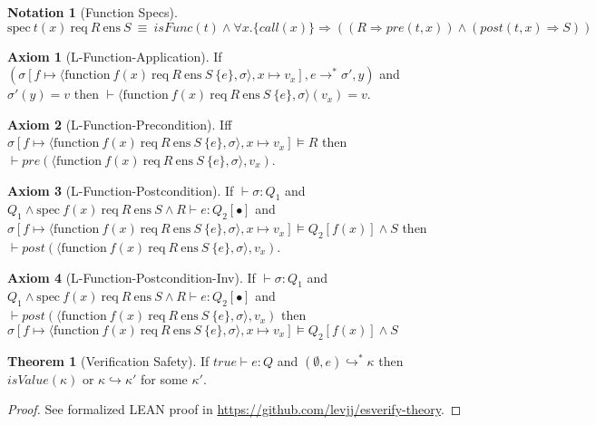 \documentclass[10pt]{article}
\newcommand{\fres}[3][f]{\text{spec}~#1 (x)~\text{req}~#2~\text{ens}~#3}
\newcommand{\fval}[5][f]{\langle \text{function}~#1 (x)~\text{req}~#2~\text{ens}~#3~\{#4\}, #5 \rangle}
\newcommand{\forallc}[1]{\forall x. \{call(x)\} \Rightarrow #1}
\theoremstyle{definition}
\newtheorem{axiom}{Axiom}
\newtheorem{notation}{Notation}
\newtheorem{theorem}{Theorem}
\begin{document}
\begin{notation}[Function Specs] ~ \\
  $\fres[t]{R}{S} ~\equiv~ isFunc(t) \wedge \forallc{((R \Rightarrow pre(t,x)) \wedge (post(t, x) \Rightarrow S))}$
\end{notation}

\begin{axiom}[L-Function-Application]
  If $(\sigma[f\mapsto \fval{R}{S}{e}{\sigma},x\mapsto v_x], e \longrightarrow^{*} \sigma', y)$
  and $\sigma'(y) = v$ then $\vdash \fval{R}{S}{e}{\sigma} (v_x) = v$.
\end{axiom}

\begin{axiom}[L-Function-Precondition]
  Iff $\sigma[f\mapsto \fval{R}{S}{e}{\sigma},x\mapsto v_x] \models R$
  then $\vdash pre(\fval{R}{S}{e}{\sigma}, v_x)$.
\end{axiom}

\begin{axiom}[L-Function-Postcondition]
  If $\vdash \sigma : Q_1$ and $Q_1 \wedge \fres{R}{S} \wedge R \vdash e : Q_2[\bullet]$
  and $\sigma[f\mapsto \fval{R}{S}{e}{\sigma},x\mapsto v_x] \models Q_2[f(x)] \wedge S$
  then $\vdash post(\fval{R}{S}{e}{\sigma}, v_x)$.
\end{axiom}

\begin{axiom}[L-Function-Postcondition-Inv]
  If $\vdash \sigma : Q_1$ and $Q_1 \wedge \fres{R}{S} \wedge R \vdash e : Q_2[\bullet]$
  and $\vdash post(\fval{R}{S}{e}{\sigma}, v_x)$ then
  $\sigma[f\mapsto \fval{R}{S}{e}{\sigma},x\mapsto v_x] \models Q_2[f(x)] \wedge S$
\end{axiom}

\begin{theorem}[Verification Safety]
  If $true \vdash e : Q$ and $(\emptyset, e) \hookrightarrow^{*} \kappa$ then $isValue(\kappa)$ or
  $\kappa \hookrightarrow \kappa'$ for some $\kappa'$.
\end{theorem}

\begin{proof}
  See formalized LEAN proof in \url{https://github.com/levjj/esverify-theory}.
\end{proof}
\end{document}
